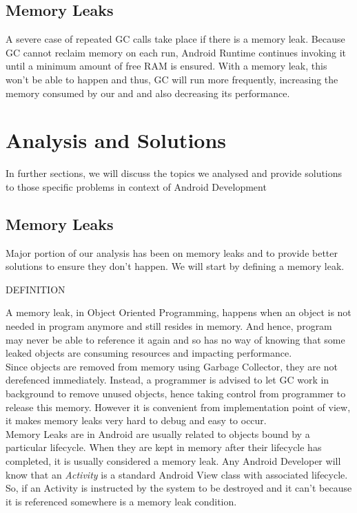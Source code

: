 \documentclass[journal]{IEEEtran}
\begin{document}
\subsection{Memory Leaks}
A severe case of repeated GC calls take place if there is a memory leak. Because GC cannot reclaim memory on each run, Android Runtime continues invoking it until a minimum amount of free RAM is ensured. With a memory leak, this won't be able to happen and thus, GC will run more frequently, increasing the memory consumed by our and and also decreasing its performance.

\newpage

\section{Analysis and Solutions}
In further sections, we will discuss the topics we analysed and provide solutions to those specific problems in context of Android Development

\subsection{Memory Leaks}
Major portion of our analysis has been on memory leaks and to provide better solutions to ensure they don't happen. We will start by defining a memory leak.\\

\begin{center}
	DEFINITION
\end{center}
A memory leak, in Object Oriented Programming, happens when an object is not needed in program anymore and still resides in memory. And hence, program may never be able to reference it again and so has no way of knowing that some leaked objects are consuming resources and impacting performance.\\
Since objects are removed from memory using Garbage Collector, they are not derefenced immediately. Instead, a programmer is advised to let GC work in background to remove unused objects, hence taking control from programmer to release this memory. However it is convenient from implementation point of view, it makes memory leaks very hard to debug and easy to occur.\\

Memory Leaks are in Android are usually related to objects bound by a particular lifecycle. When they are kept in memory after their lifecycle has completed, it is usually considered a memory leak. Any Android Developer will know that an \emph{Activity} is a standard Android View class with associated lifecycle. So, if an Activity is instructed by the system to be destroyed and it can't because it is referenced somewhere is a memory leak condition.\\
\end{document}
